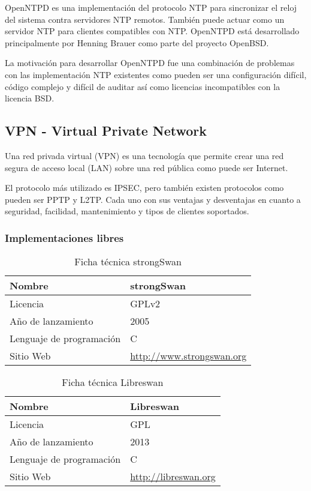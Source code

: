 OpenNTPD es una implementación del protocolo NTP para sincronizar el reloj del sistema contra servidores NTP remotos. También puede actuar como un servidor NTP para clientes compatibles con NTP. OpenNTPD está desarrollado principalmente por Henning Brauer como parte del proyecto OpenBSD.

\bigskip
La motivación para desarrollar OpenNTPD fue una combinación de problemas con las implementación NTP existentes como pueden ser una configuración difícil, código complejo y difícil de auditar así como licencias incompatibles con la licencia BSD.


\subsection {VPN - Virtual Private Network}

Una red privada virtual (VPN) es una tecnología que permite crear una red segura de acceso local (LAN) sobre una red pública como puede ser Internet.

\bigskip
El protocolo más utilizado es IPSEC, pero también existen protocolos como pueden ser PPTP y L2TP. Cada uno con sus ventajas y desventajas en cuanto a seguridad, facilidad, mantenimiento y tipos de clientes soportados.

\subsubsection {Implementaciones libres}

\begin{table}[H]
\begin{tabular}{|l|l|}
\hline
Nombre                   & strongSwan                       \\ \hline
Licencia                 & GPLv2                            \\ \hline
Año de lanzamiento       & 2005                           \\ \hline
Lenguaje de programación & C                              \\ \hline
Sitio Web                & \url{http://www.strongswan.org} \\ \hline
\end{tabular}
\caption{Ficha técnica strongSwan}
\end{table}

\begin{table}[H]
\begin{tabular}{|l|l|}
\hline
Nombre                   & Libreswan                       \\ \hline
Licencia                 & GPL                            \\ \hline
Año de lanzamiento       & 2013                           \\ \hline
Lenguaje de programación & C                              \\ \hline
Sitio Web                & \url{http://libreswan.org} \\ \hline
\end{tabular}
\caption{Ficha técnica Libreswan}
\end{table}


